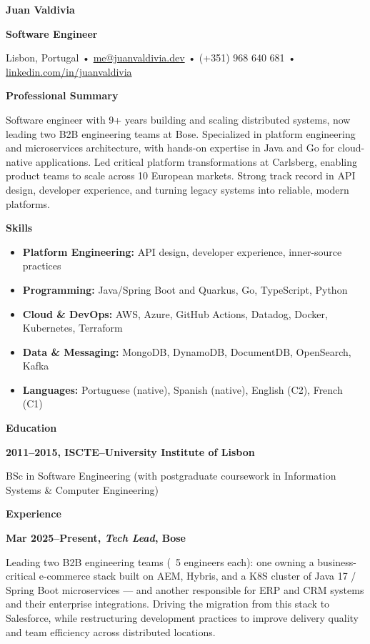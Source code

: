 \documentclass[a4paper,12pt]{memoir}
\newcommand{\cvheading}[1]{{\Large\bfseries\color{RoyalBlue} #1} \par\vspace{.6\baselineskip}}
\newcommand{\cvsubheading}[1]{{\large\bfseries #1} \bigbreak}
\newcommand{\Sep}{\vspace{1em}}
\newcommand{\SmallSep}{\vspace{0.5em}}
\newcommand{\CVSection}[1]{{\large\textbf{#1}}\par\SmallSep}
\newcommand{\CVItem}[2]{\textbf{\color{RoyalBlue} #1}\par\small{#2}\SmallSep}
\begin{document}
\cvheading{Juan Valdivia}
\cvsubheading{Software Engineer}

\small{Lisbon, Portugal • \url{me@juanvaldivia.dev} • (+351) 968 640 681 • \url{linkedin.com/in/juanvaldivia}}\\
\SmallSep

\CVSection{Professional Summary}
Software engineer with 9+ years building and scaling distributed systems, now leading two B2B engineering teams at Bose. Specialized in platform engineering and microservices architecture, with hands-on expertise in Java and Go for cloud-native applications. Led critical platform transformations at Carlsberg, enabling product teams to scale across 10 European markets. Strong track record in API design, developer experience, and turning legacy systems into reliable, modern platforms.
\Sep

\CVSection{Skills}
\begin{itemize}[leftmargin=*,label={•}]
    \item \textbf{Platform Engineering:} API design, developer experience, inner-source practices
    \item \textbf{Programming:} Java/Spring Boot and Quarkus, Go, TypeScript, Python
    \item \textbf{Cloud \& DevOps:} AWS, Azure, GitHub Actions, Datadog, Docker, Kubernetes, Terraform
    \item \textbf{Data \& Messaging:} MongoDB, DynamoDB, DocumentDB, OpenSearch, Kafka
    \item \textbf{Languages:} Portuguese (native), Spanish (native), English (C2), French (C1)
\end{itemize}
\Sep

\CVSection{Education}
\CVItem{2011--2015, ISCTE–University Institute of Lisbon}{BSc in Software Engineering (with postgraduate coursework in Information Systems \& Computer Engineering)}
\Sep

\CVSection{Experience}
\CVItem{Mar 2025–Present, \textit{Tech Lead}, Bose}{
Leading two B2B engineering teams (~5 engineers each): one owning a business-critical e-commerce stack built on AEM, Hybris, and a K8S cluster of Java 17 / Spring Boot microservices — and another responsible for ERP and CRM systems and their enterprise integrations. Driving the migration from this stack to Salesforce, while restructuring development practices to improve delivery quality and team efficiency across distributed locations.
}
\end{document}
